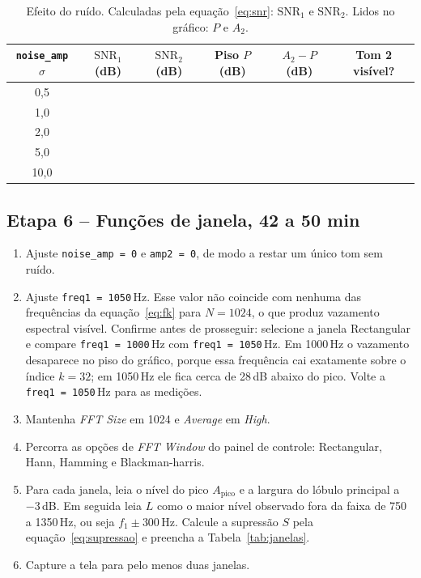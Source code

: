 \documentclass[11pt,a4paper]{article}
\begin{document}
\begin{table}[H]
  \centering
  \setlength{\tabcolsep}{4.5pt}
  \begin{tabular}{c c c c c c}
    \toprule
    \textbf{\texttt{noise\_amp} $\sigma$} & \textbf{$\mathrm{SNR}_1$ (dB)} &
      \textbf{$\mathrm{SNR}_2$ (dB)} & \textbf{Piso $P$ (dB)} &
      \textbf{$A_2 - P$ (dB)} & \textbf{Tom 2 visível?} \\
    \midrule
    0{,}5 &  &  &  &  &  \\
    1{,}0 &  &  &  &  &  \\
    2{,}0 &  &  &  &  &  \\
    5{,}0 &  &  &  &  &  \\
    10{,}0 &  &  &  &  &  \\
    \bottomrule
  \end{tabular}
  \caption{Efeito do ruído. Calculadas pela equação~\eqref{eq:snr}:
    $\mathrm{SNR}_1$ e $\mathrm{SNR}_2$. Lidos no gráfico: $P$ e $A_2$.}
  \label{tab:snr}
\end{table}

\subsection*{Etapa 6 -- Funções de janela, 42 a 50 min}

\begin{instrucao}
\begin{enumerate}[label=\arabic*.]
  \item Ajuste \texttt{noise\_amp = 0} e \texttt{amp2 = 0}, de modo a
    restar um único tom sem ruído.
  \item Ajuste \texttt{freq1 = 1050}\,Hz. Esse valor não coincide com nenhuma
    das frequências da equação~\eqref{eq:fk} para $N = 1024$, o que produz
    vazamento espectral visível. Confirme antes de prosseguir: selecione a
    janela Rectangular e compare \texttt{freq1 = 1000}\,Hz com
    \texttt{freq1 = 1050}\,Hz. Em 1000\,Hz o vazamento desaparece no piso do
    gráfico, porque essa frequência cai exatamente sobre o índice $k = 32$;
    em 1050\,Hz ele fica cerca de 28\,dB abaixo do pico. Volte a
    \texttt{freq1 = 1050}\,Hz para as medições.
  \item Mantenha \textit{FFT Size} em 1024 e \textit{Average} em \textit{High}.
  \item Percorra as opções de \textit{FFT Window} do painel de controle:
    Rectangular, Hann, Hamming e Blackman-harris.
  \item Para cada janela, leia o nível do pico $A_{\mathrm{pico}}$ e a largura
    do lóbulo principal a $-3$\,dB. Em seguida leia $L$ como o maior nível
    observado fora da faixa de 750 a 1350\,Hz, ou seja $f_1 \pm 300$\,Hz.
    Calcule a supressão $S$ pela equação~\eqref{eq:supressao} e preencha a
    Tabela~\ref{tab:janelas}.
  \item Capture a tela para pelo menos duas janelas.
\end{enumerate}
\end{instrucao}
\end{document}
